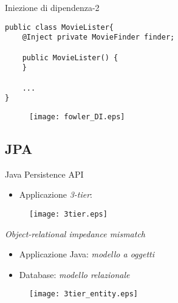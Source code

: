 \begin{frame}[fragile]{Iniezione di dipendenza-2}


\begin{lstlisting}[basicstyle={\tiny\ttfamily}]
public class MovieLister{
    @Inject private MovieFinder finder;
    
    public MovieLister() {
    }
    
    ...
}
\end{lstlisting}


\begin{figure}
	\centering
	\texttt{[image: fowler\_DI.eps]}
\end{figure}


\end{frame}




\subsection{JPA}
\begin{frame}{Java Persistence API}

\begin{itemize}
\item Applicazione \textsl{3-tier}:
\end{itemize}

\begin{figure}
	\centering
	\texttt{[image: 3tier.eps]}
\end{figure}

\end{frame}


\begin{frame}{\textsl{Object-relational impedance mismatch}}


\begin{itemize}

\vspace{0.4em}

\item Applicazione Java: \textsl{modello a oggetti}

\vspace{0.7em}

\item Database: \textsl{modello relazionale}

\end{itemize}

\begin{figure}
	\centering
	\texttt{[image: 3tier\_entity.eps]}
\end{figure}

\end{frame}




